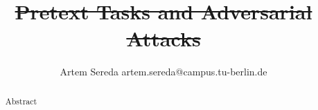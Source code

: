 \documentclass[12pt]{extarticle}
\title{\st{Pretext Tasks and Adversarial Attacks}}
\author{Artem Sereda artem.sereda@campus.tu-berlin.de}
\begin{document}
    \maketitle

    \begin{abstract}
        \normalsize
        Abstract
    \end{abstract}

    \newpage
    
    \newpage
    

    


    \printbibliography
\end{document}
